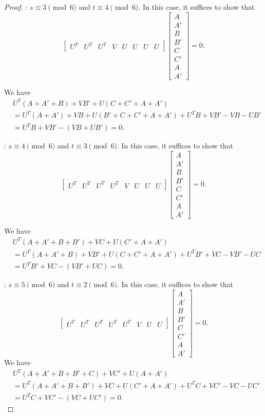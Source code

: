 \documentclass[11pt,a4paper]{amsart}
\theoremstyle{definition}
\DeclareMathOperator{\C}{\mathbb{C}}
\numberwithin{equation}{section}
\newcommand{\A}{\mathbb{A}}
\begin{document}
\begin{proof}
\medskip
{}: $s\equiv 3\pmod 6$ and $t\equiv 4\pmod 6$. In this case, it suffices to show that \[\begin{bmatrix}
    U^T & U^T & U^T & V & U & U & U&U 
\end{bmatrix} \begin{bmatrix}
    A\\A'\\B\\B'\\C\\C'\\A\\A'
\end{bmatrix}=0.\]

We have 
\[
\begin{aligned}
&U^T(A+A'+B) + VB'+U(C+C'+A+A')\\
&=U^T(A+A')+VB+U(B'+C+C'+A+A') +U^TB+VB' -VB -UB' \\
&=U^TB+VB' -(VB +UB')=0.
\end{aligned}
\]


\medskip
{}: $s\equiv 4\pmod 6$ and $t\equiv 3\pmod 6$. In this case, it suffices to show that \[\begin{bmatrix}
    U^T & U^T & U^T & U^T&V & U & U & U 
\end{bmatrix} \begin{bmatrix}
    A\\A'\\B\\B'\\C\\C'\\A\\A'
\end{bmatrix}=0.\]

We have 
\[
\begin{aligned}
&U^T(A+A'+B+B') + VC+U(C'+A+A')\\
&=U^T(A+A'+B) + VB'+U(C+C'+A+A') +U^TB'+VC -VB' -UC \\
&=U^TB'+VC  -(VB' +UC)=0.
\end{aligned}
\]


\medskip
{}: $s\equiv 5\pmod 6$ and $t\equiv 2\pmod 6$. In this case, it suffices to show that \[\begin{bmatrix}
    U^T & U^T & U^T &U^T &U^T & V & U & U 
\end{bmatrix} \begin{bmatrix}
    A\\A'\\B\\B'\\C\\C'\\A\\A'
\end{bmatrix}=0.\]
We have 
\[
\begin{aligned}
&U^T(A+A'+B+B'+C) + VC'+U(A+A')\\
&=U^T(A+A'+B+B') + VC+U(C'+A+A')+U^TC+VC' - VC -UC' \\
&=U^TC+VC'  -(VC +UC')=0.
\end{aligned}
\]

\end{proof}
\end{document}
